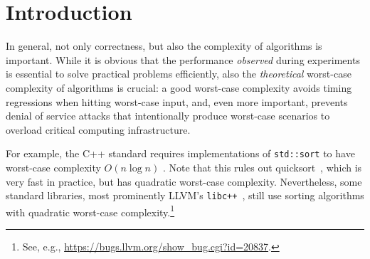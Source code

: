 \documentclass[acmsmall]{acmart}
\newcommand{\is}{\lstinline[language=isabelle]}
\begin{document}


\maketitle



\section{Introduction}
In general, not only correctness, but also the complexity of algorithms is important. While it is obvious that the performance \emph{observed} during experiments is essential to solve practical problems efficiently, also the \emph{theoretical} worst-case complexity of algorithms is crucial: a good worst-case complexity avoids timing regressions when hitting worst-case input, and, even more important, prevents denial of service attacks that intentionally produce worst-case scenarios to overload critical computing infrastructure.

For example, the C++ standard requires  implementations of \is{std::sort} to have worst-case complexity $O(n\log n)$ \cite{stdlib-sort}. 
Note that this rules out quicksort~\cite{Hoare61}, which is very fast in practice, but has
\clearpage
quadratic worst-case complexity.
Nevertheless, some standard libraries, most prominently LLVM's \is{libc++}~\cite{libc++}, still use sorting algorithms with quadratic worst-case complexity.\footnote{See, e.g., \url{https://bugs.llvm.org/show_bug.cgi?id=20837}.}
\end{document}
